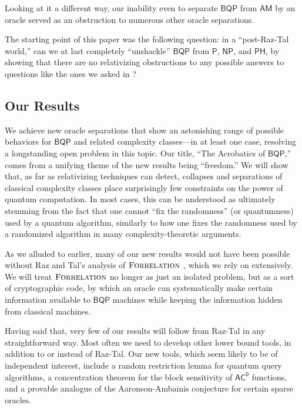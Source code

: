 \documentclass[10pt,a4paper]{article}
\newcommand{\Forrelation}{\normalfont\textsc{Forrelation}}
\begin{document}
Looking at it a different way, our inability even to separate $\mathsf{BQP}$ from $\mathsf{AM}$ by an oracle served as an obstruction to numerous other oracle separations.

The starting point of this paper was the following question: in a ``post-Raz-Tal world,'' can we at last completely ``unshackle'' $\mathsf{BQP}$ from $\mathsf{P}$, $\mathsf{NP}$, and $\mathsf{PH}$, by showing that there are no relativizing obstructions to any possible answers to questions like the ones we asked in ?

\subsection{Our Results}
\label{sec:results}
We achieve new oracle separations that show an astonishing range of possible behaviors for $\mathsf{BQP}$ and related complexity classes---in at least one case, resolving a longstanding open problem in this topic.  Our title, ``The Acrobatics of $\mathsf{BQP}$,'' comes from a unifying theme of the new results being ``freedom.'' We will show that, as far as relativizing techniques can detect, collapses and separations of classical complexity classes place surprisingly few constraints on the power of quantum computation. In most cases, this can be understood as ultimately stemming from the fact that one cannot ``fix the randomness'' (or quantumness) used by a quantum algorithm, similarly to how one fixes the randomness used by a randomized algorithm in many complexity-theoretic arguments.

As we alluded to earlier, many of our new results would not have been possible without Raz and Tal's analysis of $\Forrelation$ \cite{RT19}, which we rely on extensively.  We will treat $\Forrelation$ no longer as just an isolated problem, but as a sort of cryptographic code, by which an oracle can systematically make certain information available to $\mathsf{BQP}$ machines while keeping the information hidden from classical machines.

Having said that, very few of our results will follow from Raz-Tal in any straightforward way.  Most often we need to develop other lower bound tools, in addition to or instead of Raz-Tal.  Our new tools, which seem likely to be of independent interest, include a random restriction lemma for quantum query algorithms, a concentration theorem for the block sensitivity of $\mathsf{AC^0}$ functions, and a provable analogue of the Aaronson-Ambainis conjecture \cite{AA14} for certain sparse oracles.
\end{document}
